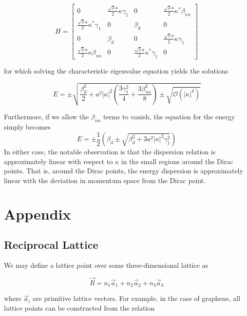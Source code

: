\documentclass{article}
\begin{document}
\begin{equation}
H =
\begin{bmatrix}
0 & \frac{\sqrt{3}a}{2}\kappa\gamma_{1} & 0 & \frac{\sqrt{3}a}{2}\kappa^{*}\beta_{nn}\\
\frac{\sqrt{3}a}{2}\kappa^{*}\gamma_{1} & 0 & \beta_{d} & 0 \\
0 & \beta_{d} & 0  & \frac{\sqrt{3}a}{2}\kappa\gamma_{1} \\
\frac{\sqrt{3}a}{2}\kappa\beta_{nn} & 0 & \frac{\sqrt{3}a}{2}\kappa^{*}\gamma_{1}& 0
\end{bmatrix}
\end{equation}

for which solving the characteristic eigenvalue equation yields the solutions

\begin{equation}
E = \pm \sqrt{\frac{\beta_d^{2}}{2} + a^{2}|\kappa|^{2}\left (\frac{3\gamma_{1}^{2}}{4} + \frac{3\beta_{nn}^{2}}{8}\right ) \pm \sqrt{\mathcal{O}(|\kappa|^{4})}}
\end{equation}

Furthermore, if we allow the $\beta_{nn}$ terms to vanish, the equation for the energy simply becomes
\begin{equation}
E = \pm\frac{1}{2}\left ( \beta_{d} \pm \sqrt{\beta_{d}^{2} + 3a^{2}|\kappa|^{2}\gamma_{1}^{2}} \right)
\end{equation}
In either case, the notable observation is that the dispersion relation is approximately linear with respect to $\kappa$ in the small regions around the Dirac points. That is, around the Dirac
points, the energy dispersion is approximately linear with the deviation in momentum space from the Dirac point. 

\section{Appendix}
\subsection{Reciprocal Lattice}
We may define a lattice point over some three-dimensional lattice as

\begin{equation}
\vec{R} = n_{1}\vec{a}_{1} + n_{2}\vec{a}_{2} + n_{3}\vec{a}_{3}
\end{equation}

where $\vec{a}_{i}$ are primitive lattice vectors. For example, in the case of
graphene, all lattice points can be constructed from the relation
\end{document}
